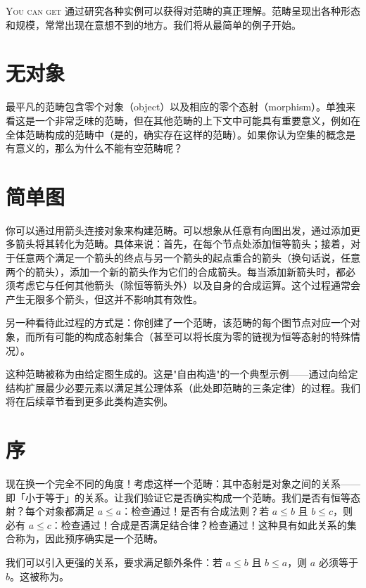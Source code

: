 
\lettrine[lhang=0.17]{Y}{ou can get} 通过研究各种实例可以获得对范畴的真正理解。范畴呈现出各种形态和规模，常常出现在意想不到的地方。我们将从最简单的例子开始。

\section{无对象}

最平凡的范畴包含零个对象（object）以及相应的零个态射（morphism）。单独来看这是一个非常乏味的范畴，但在其他范畴的上下文中可能具有重要意义，例如在全体范畴构成的范畴中（是的，确实存在这样的范畴）。如果你认为空集的概念是有意义的，那么为什么不能有空范畴呢？

\section{简单图}

你可以通过用箭头连接对象来构建范畴。可以想象从任意有向图出发，通过添加更多箭头将其转化为范畴。具体来说：首先，在每个节点处添加恒等箭头；接着，对于任意两个满足一个箭头的终点与另一个箭头的起点重合的箭头（换句话说，任意两个的箭头），添加一个新的箭头作为它们的合成箭头。每当添加新箭头时，都必须考虑它与任何其他箭头（除恒等箭头外）以及自身的合成运算。这个过程通常会产生无限多个箭头，但这并不影响其有效性。

另一种看待此过程的方式是：你创建了一个范畴，该范畴的每个图节点对应一个对象，而所有可能的构成态射集合（甚至可以将长度为零的链视为恒等态射的特殊情况）。

这种范畴被称为由给定图生成的。这是"自由构造"的一个典型示例——通过向给定结构扩展最少必要元素以满足其公理体系（此处即范畴的三条定律）的过程。我们将在后续章节看到更多此类构造实例。

\section{序}

现在换一个完全不同的角度！考虑这样一个范畴：其中态射是对象之间的关系——即「小于等于」的关系。让我们验证它是否确实构成一个范畴。我们是否有恒等态射？每个对象都满足 $a \leqslant a$：检查通过！是否有合成法则？若 $a \leqslant b$ 且 $b \leqslant c$，则必有 $a \leqslant c$：检查通过！合成是否满足结合律？检查通过！这种具有如此关系的集合称为，因此预序确实是一个范畴。

我们可以引入更强的关系，要求满足额外条件：若 $a \leqslant b$ 且 $b \leqslant a$，则 $a$ 必须等于 $b$。这被称为。

